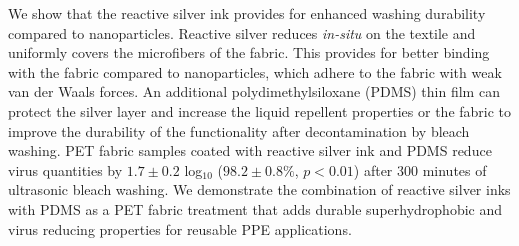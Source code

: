 \documentclass[journal=jacsat,manuscript=article]{achemso}
\begin{document}

We show that the reactive silver ink provides for enhanced washing durability compared to nanoparticles.  
Reactive silver reduces \textit{in-situ}
on the textile and uniformly covers 
the microfibers of the fabric.  
This provides for better binding with the fabric compared to nanoparticles, which adhere to the fabric with weak van der Waals forces.  
An additional polydimethylsiloxane (PDMS) thin film can protect the silver layer and increase the liquid repellent properties or the fabric to improve %
the durability of the functionality after decontamination by bleach washing. PET fabric samples coated with reactive silver ink and PDMS reduce virus quantities by $1.7 \pm 0.2$ log$_{10}$ ($98.2 \pm 0.8 \%$, $p < 0.01$) after 300 minutes of ultrasonic bleach washing. We demonstrate the combination of reactive silver inks with PDMS as a PET fabric treatment that adds durable superhydrophobic and virus reducing properties for reusable PPE applications. 











\end{document}
